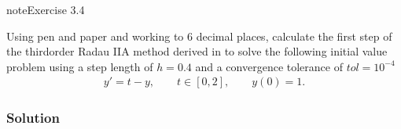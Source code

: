 \documentclass[letterpaper,10pt,english]{jupyterBook}
\begin{document}
\begin{sphinxadmonition}{note}{Exercise 3.4}

\sphinxAtStartPar
Using pen and paper and working to 6 decimal places, calculate the first step of the third\sphinxhyphen{}order Radau IIA method derived in {\hyperref[\detokenize{3_IRKs/3.4_IRK_exercises:ex3-3}]{}} to solve the following initial value problem using a step length of \(h=0.4\) and a convergence tolerance of \(tol = 10^{-4}\)
\begin{align*}
  y' =t - y, \qquad t \in [0,2], \qquad y(0) = 1.
\end{align*}\subsubsection*{Solution}


\end{sphinxadmonition}
\end{document}
